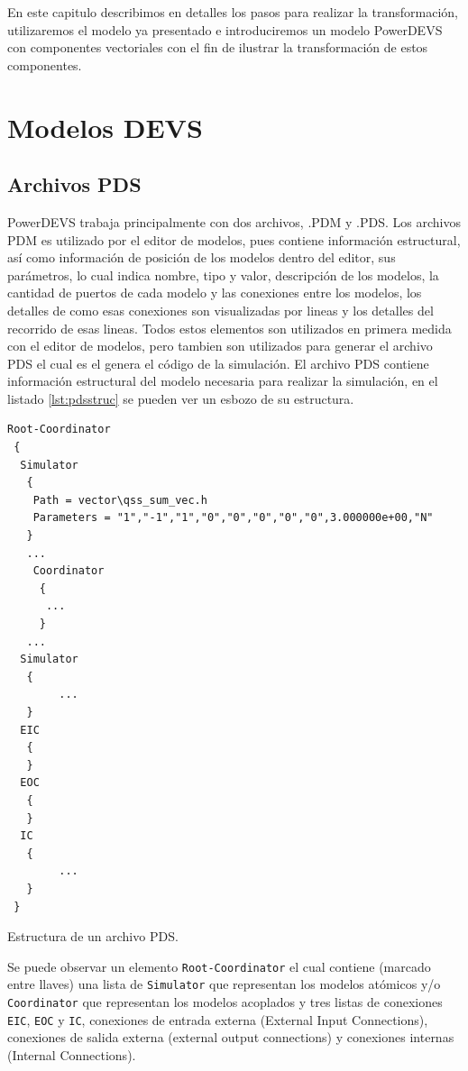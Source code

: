 En este capitulo describimos en detalles los pasos para realizar la transformación, utilizaremos el modelo ya presentado e introduciremos un modelo PowerDEVS con componentes vectoriales con el fin de ilustrar la transformación de estos componentes.

\section{Modelos DEVS}

        \subsection{Archivos PDS}
        PowerDEVS trabaja principalmente con dos archivos, .PDM y .PDS.
        Los archivos PDM es utilizado por el editor de modelos, pues contiene información estructural, así como información de posición de los modelos dentro del 
        editor, sus parámetros, lo cual indica nombre, tipo y valor, descripción de los modelos, la cantidad de puertos de cada modelo y las conexiones
        entre los modelos, los detalles de como esas conexiones son visualizadas por lineas y los detalles del recorrido de esas lineas. 
        Todos estos elementos son utilizados en primera medida con el editor de modelos, pero tambien son utilizados para generar el archivo PDS el cual es el 
        genera el código de la simulación.
        El archivo PDS contiene información estructural del modelo necesaria para realizar la simulación, en el listado \ref{lst:pdsstruc} se pueden ver un 
        esbozo de su estructura.
        
\begin{listing}[H]
\begin{verbatim}
Root-Coordinator
 {
  Simulator
   {
    Path = vector\qss_sum_vec.h
    Parameters = "1","-1","1","0","0","0","0","0",3.000000e+00,"N"
   }
   ...
    Coordinator
     {
      ...
     }
   ...     
  Simulator
   {
        ...
   }
  EIC
   {
   }
  EOC
   {
   }
  IC
   {
        ...
   }
 }
\end{verbatim}
\caption{Estructura de un archivo PDS.}
\label{lst:pdsstruc}
\end{listing}

        Se puede observar un elemento \texttt{Root-Coordinator} el cual contiene (marcado entre llaves) una lista de \texttt{Simulator} que representan 
	los modelos atómicos y/o \texttt{Coordinator} que representan los modelos acoplados y tres listas de 
        conexiones \texttt{EIC}, \texttt{EOC} y \texttt{IC}, conexiones de entrada externa (External Input Connections), 
        conexiones de salida externa (external output connections) y conexiones internas (Internal Connections).

